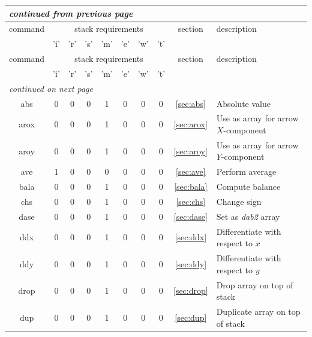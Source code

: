 \documentclass[a4paper,10pt]{report}
\begin{document}
\begin{center}
  \begin{longtable}{|c|c|c|c|c|c|c|c|c|l|}
    \hline
    \multicolumn{10}{|l|}{\small\sl continued from previous page} \\
    \hline command & \multicolumn{7}{|c|}{stack requirements} & section & description \\
    \hline   & 'i' & 'r' & 's' & 'm' & 'e' & 'w' & 't' &   &   \\
    \hline \endhead
    \hline command & \multicolumn{7}{|c|}{stack requirements} & section & description \\
    \hline   & 'i' & 'r' & 's' & 'm' & 'e' & 'w' & 't' &   &   \\
    \hline \endfirsthead
    \hline
    \multicolumn{10}{|l|}{\small\sl continued on next page} \\
    \hline \endfoot
    \endlastfoot
    abs \index{b2plot, abs}        & 0 & 0 & 0 & 1 & 0 & 0 & 0 & \ref{sec:abs}   & Absolute value \\
    arox \index{b2plot, arox}      & 0 & 0 & 0 & 1 & 0 & 0 & 0 & \ref{sec:arox}  & Use as array for arrow $X$-component \\
    aroy \index{b2plot, aroy}      & 0 & 0 & 0 & 1 & 0 & 0 & 0 & \ref{sec:aroy}  & Use as array for arrow $Y$-component \\
    ave \index{b2plot, ave}        & 1 & 0 & 0 & 0 & 0 & 0 & 0 & \ref{sec:ave}   & Perform average \\
    bala \index{b2plot, bala}      & 0 & 0 & 0 & 1 & 0 & 0 & 0 & \ref{sec:bala}  & Compute balance \\
    chs \index{b2plot, chs}        & 0 & 0 & 0 & 1 & 0 & 0 & 0 & \ref{sec:chs}   & Change sign \\
    dase \index{b2plot, dase}      & 0 & 0 & 0 & 1 & 0 & 0 & 0 & \ref{sec:dase}  & Set as {\em dab2} array \\
    ddx \index{b2plot, ddx}        & 0 & 0 & 0 & 1 & 0 & 0 & 0 & \ref{sec:ddx}   & Differentiate with respect to $x$ \\
    ddy \index{b2plot, ddy}        & 0 & 0 & 0 & 1 & 0 & 0 & 0 & \ref{sec:ddy}   & Differentiate with respect to $y$ \\
    drop \index{b2plot, drop}      & 0 & 0 & 0 & 1 & 0 & 0 & 0 & \ref{sec:drop}  & Drop array on top of stack \\
    dup \index{b2plot, dup}        & 0 & 0 & 0 & 1 & 0 & 0 & 0 & \ref{sec:dup}   & Duplicate array on top of stack \\

\end{longtable}
\end{center}
\end{document}
